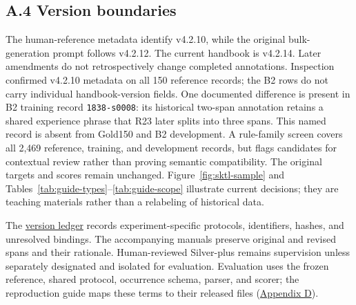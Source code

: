 \subsection{A.4 Version boundaries}
\label{sec:guide-version-history}
The human-reference metadata identify v4.2.10, while the original bulk-generation prompt follows v4.2.12. The current handbook is v4.2.14. Later amendments do not retrospectively change completed annotations. Inspection confirmed v4.2.10 metadata on all 150 reference records; the B2 rows do not carry individual handbook-version fields. One documented difference is present in B2 training record \texttt{1838-s0008}: its historical two-span annotation retains a shared experience phrase that R23 later splits into three spans. This named record is absent from Gold150 and B2 development. A rule-family screen covers all 2,469 reference, training, and development records, but flags candidates for contextual review rather than proving semantic compatibility. The original targets and scores remain unchanged. Figure~\ref{fig:sktl-sample} and Tables~\ref{tab:guide-types}--\ref{tab:guide-scope} illustrate current decisions; they are teaching materials rather than a relabeling of historical data.

The \href{https://github.com/AlfredJamesLi/chinese-skillspan-benchmark/blob/36f009fab01b8433355cb7ef5af8fad02c6cc519/reproduction/process_archive_20260924/source/tex/review20260923/version_matrix.tex}{version ledger} records experiment-specific protocols, identifiers, hashes, and unresolved bindings. The accompanying manuals preserve original and revised spans and their rationale. Human-reviewed Silver-plus remains supervision unless separately designated and isolated for evaluation. Evaluation uses the frozen reference, shared protocol, occurrence schema, parser, and scorer; the reproduction guide maps these terms to their released files (\hyperref[app:d]{Appendix D}).
